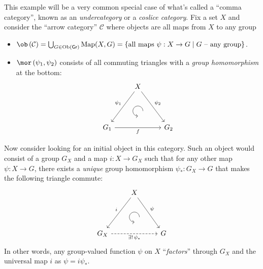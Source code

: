 \begin{example}
This example will be a very common special case of what's called a ``comma category'', known as an \emph{undercategory} or a \emph{coslice category}. Fix a set $X$ and consider the ``arrow category'' $\mathcal{C}$
where objects are all maps from $X$ to any group
\begin{itemize}
\item $\ob\left(\mathcal{C}\right)=\bigcup_{G\in\mathrm{Ob}(\mathsf{Gr})}\mathrm{Map}(X,G)=\left\{ \text{all maps }\psi:X\to G\mid G\text{ -- any group}\right\}$.
\item $\mor\left(\psi_{1},\psi_{2}\right)$ consists of all commuting triangles
with a \emph{group homomorphism} at the bottom:
\[\begin{tikzcd}[every matrix/.append style={name=m},   
execute at end picture={\draw [<-] ([xshift=0mm,yshift=-6mm]m-2-2.north) arc[start angle=-90,delta angle=-270,radius=0.25cm];}]
   & X\arrow[ddl,swap,"\psi_1" ]\arrow[ddr,"\psi_2"] & \\
   & \, & \\
   G_1 \arrow[rr,swap,"f"]& & G_2
\end{tikzcd}\]
\end{itemize}
Now consider looking for an initial object in this category. Such
an object would consist of a group $G_{X}$ and a map $i:X\to G_{X}$
such that for any other map $\psi:X\to G$, there exists a \emph{unique}
group homomorphism $\psi_{\ast}:G_{X}\to G$ that makes the following
triangle commute:\[\begin{tikzcd}[every matrix/.append style={name=m},   
execute at end picture={\draw [<-] ([xshift=0mm,yshift=-6mm]m-2-2.north) arc[start angle=-90,delta angle=-270,radius=0.25cm];}]
   & X\arrow[ddl,swap,"i" ]\arrow[ddr,"\psi"] & \\
   & \, & \\
   G_X \arrow[rr,dashed,swap,"\exists!\,\psi_\ast"]& & G
\end{tikzcd}\]In other words, any group-valued function $\psi$ on $X$ ``\emph{factors}''
through $G_{X}$ and the universal map $i$ as $\psi=i\psi_{\ast}$.


\end{example}
